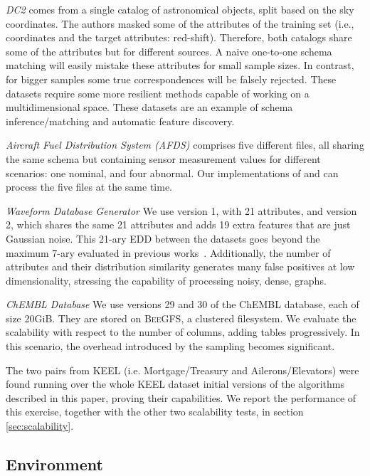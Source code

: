\emph{DC2} comes from a single catalog of astronomical
    objects, split based on the sky coordinates.
    The authors masked some of the attributes of the training set (i.e., coordinates and the
    target attributes: red-shift). 
    Therefore, both catalogs share some of the attributes but for different sources.
    A naive one-to-one schema matching will
    easily mistake these attributes for small sample sizes. In contrast, for bigger samples
    some true correspondences will be falsely rejected.
    These datasets require some more resilient methods capable of working on a
    multidimensional space.
    These datasets are an example of schema inference/matching and automatic feature discovery.
    
\emph{Aircraft Fuel Distribution System (AFDS)} comprises five different files,
    all sharing the same schema but containing sensor measurement values for different scenarios:
    one nominal, and four abnormal. Our implementations of \Find and \PresQ can process
    the five files at the same time.

\emph{Waveform Database Generator}
    We use version 1, with 21 attributes, and version 2, which shares the same 21 attributes and adds 19
    extra features that are just Gaussian noise. This 21-ary EDD between the datasets goes
    beyond the maximum 7-ary evaluated in previous works~\cite{Dursch2019}.
    Additionally, the number of attributes and their distribution similarity generates many false positives at low
    dimensionality, stressing the capability of processing noisy, dense, graphs.

\emph{ChEMBL Database}
    We use versions 29 and 30 of the ChEMBL database, each of size 20GiB. They are
    stored on \textsc{BeeGFS}, a clustered filesystem. We evaluate the scalability with respect to the number of
    columns, adding tables progressively. In this scenario, the overhead introduced by the sampling becomes significant.

The two pairs from KEEL (i.e. Mortgage/Treasury and Ailerons/Elevators) were found
running over the whole KEEL dataset initial versions of the algorithms described in
this paper, proving their capabilities. We report the performance of this exercise, together
with the other two scalability tests, in section \ref{sec:scalability}.

\subsection{Environment}

